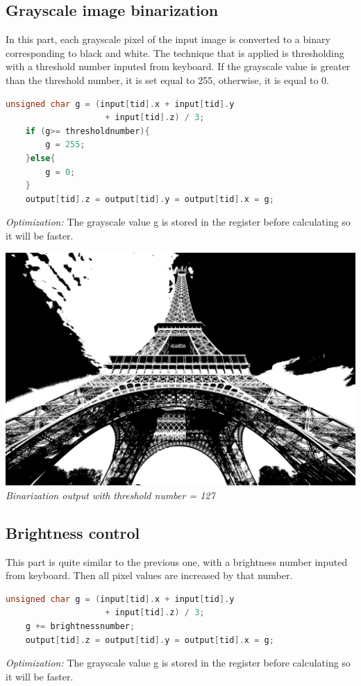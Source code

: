 \documentclass{article}
\begin{document}
\subsection{Grayscale image binarization}
In this part, each grayscale pixel of the input image is converted to a binary corresponding to black and white. The technique that is applied is thresholding with a threshold number inputed from keyboard. If the grayscale value is greater than the threshold number, it is set equal to 255, otherwise, it is equal to 0.
\\
\begin{lstlisting}[language=C]
unsigned char g = (input[tid].x + input[tid].y 
                    + input[tid].z) / 3;
	if (g>= thresholdnumber){
		g = 255;
	}else{
		g = 0;
	}
    output[tid].z = output[tid].y = output[tid].x = g; 
\end{lstlisting}
\textit{Optimization:} The grayscale value g is stored in the register before calculating so it will be faster.
\\
\begin{center}
    \includegraphics[scale=0.08]{threshold.jpg}
    \\
    \textit{Binarization output with threshold number = 127}
\end{center}

\subsection{Brightness control}
This part is quite similar to the previous one, with a brightness number inputed from keyboard. Then all pixel values are increased by that number. 
\begin{lstlisting}[language=C]
unsigned char g = (input[tid].x + input[tid].y 
                    + input[tid].z) / 3;
	g += brightnessnumber;
    output[tid].z = output[tid].y = output[tid].x = g; 
\end{lstlisting}
\textit{Optimization:} The grayscale value g is stored in the register before calculating so it will be faster.\\
\end{document}

